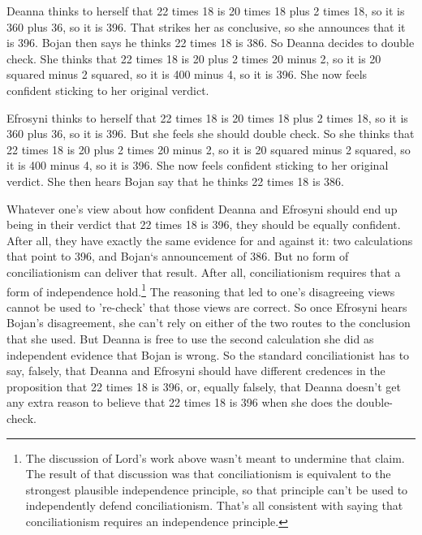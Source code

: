 \documentclass[
  10pt,
  letterpaper,
  twoside]{scrbook}
\begin{document}
{Deanna} thinks to herself that 22 times 18 is 20 times 18 plus 2 times
18, so it is 360 plus 36, so it is 396. That strikes her as conclusive,
so she announces that it is 396. {Bojan} then says he thinks 22 times 18
is 386. So {Deanna} decides to double check. She thinks that 22 times 18
is 20 plus 2 times 20 minus 2, so it is 20 squared minus 2 squared, so
it is 400 minus 4, so it is 396. She now feels confident sticking to her
original verdict.

{Efrosyni} thinks to herself that 22 times 18 is 20 times 18 plus 2
times 18, so it is 360 plus 36, so it is 396. But she feels she should
double check. So she thinks that 22 times 18 is 20 plus 2 times 20 minus
2, so it is 20 squared minus 2 squared, so it is 400 minus 4, so it is
396. She now feels confident sticking to her original verdict. She then
hears {Bojan} say that he thinks 22 times 18 is 386.

Whatever one's view about how confident {Deanna} and {Efrosyni} should
end up being in their verdict that 22 times 18 is 396, they should be
equally confident. After all, they have exactly the same evidence for
and against it: two calculations that point to 396, and {Bojan}`s
announcement of 386. But no form of conciliationism can deliver that
result. After all, conciliationism requires that a form of independence
hold.\footnote{The discussion of Lord's work above wasn't meant to
  undermine that claim. The result of that discussion was that
  conciliationism is equivalent to the strongest plausible independence
  principle, so that principle can't be used to independently defend
  conciliationism. That's all consistent with saying that
  conciliationism requires an independence principle.} The reasoning
that led to one's disagreeing views cannot be used to 're-check' that
those views are correct. So once {Efrosyni} hears {Bojan}'s
disagreement, she can't rely on either of the two routes to the
conclusion that she used. But {Deanna} is free to use the second
calculation she did as independent evidence that {Bojan} is wrong. So
the standard conciliationist has to say, falsely, that {Deanna} and
{Efrosyni} should have different credences in the proposition that 22
times 18 is 396, or, equally falsely, that {Deanna} doesn't get any
extra reason to believe that 22 times 18 is 396 when she does the
double-check.
\end{document}
